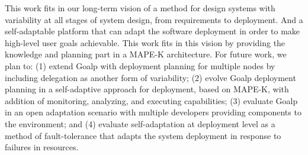 This work fits in our long-term vision of a method for design systems with variability at all stages of system design, from requirements to deployment. And a self-adaptable platform that can adapt the software deployment in order to make high-level user goals achievable. This work fits in this vision by providing the knowledge and planning part in a MAPE-K\cite{kephart_vision_2003} architecture.
For future work, we plan to: (1) extend Goalp with deployment planning for multiple nodes by including delegation as another form of variability;  (2) evolve Goalp deployment planning in a self-adaptive approach for deployment, based on MAPE-K, with addition of monitoring, analyzing, and executing capabilities; (3) evaluate Goalp in an open adaptation scenario with multiple developers providing components to the environment; and (4) evaluate self-adaptation at deployment level as a method of fault-tolerance that adapts the system deployment in response to failures in resources.

